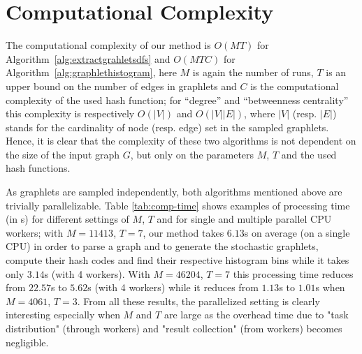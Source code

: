 \documentclass[journal]{IEEEtran}
\theoremstyle{definition}
\newcommand{\tab}[1]{Table \ref{#1}}
\newcommand{\alg}[1]{Algorithm~\ref{#1}}
\begin{document}
\section{Computational Complexity}
\label{sec:comp-anal}
The computational complexity of our method is $O(MT)$ for \alg{alg:extractgrahletsdfs} and $O(MTC)$ for \alg{alg:graphlethistogram}, here $M$ is again the number of runs, $T$ is an upper bound on the number of edges in graphlets and $C$ is the computational complexity of the used hash function; for ``degree'' and ``betweenness centrality'' this complexity is respectively $O(|V|)$ and $O(|V||E|)$, where $|V|$ (resp. $|E|$) stands for the cardinality of node (resp. edge) set in the sampled graphlets. Hence, it is clear that the complexity of these two algorithms is not dependent on the size of the input graph $G$, but only on the parameters $M$, $T$ and the used hash functions. 

As graphlets are sampled independently, both algorithms mentioned above are trivially parallelizable. \tab{tab:comp-time} shows examples of processing time (in s) for different settings of $M$, $T$ and for single and multiple parallel CPU workers; with $M=11413$, $T=7$, our method takes $6.13$s on average (on a single CPU) in order to parse a graph and to generate the stochastic graphlets, compute their hash codes and find their respective histogram bins while it takes only $3.14$s (with 4 workers). With $M=46204$, $T=7$ this processing time reduces from $22.57$s to $5.62$s (with 4 workers) while it reduces from $1.13$s to $1.01$s when $M=4061$, $T=3$. From all these results, the parallelized setting is clearly interesting especially when $M$ and $T$ are large as the overhead time due to "task distribution" (through workers) and "result collection" (from workers) becomes negligible.
 
\begin{table}[!htbp]
\begin{center}
\caption{Computation time for different values of $M$ and $T$ both in serialized and parallel (with $4$ workers) settings.}
\label{tab:comp-time}
\end{center}
\end{table}
\end{document}
